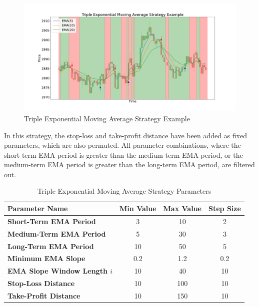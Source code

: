 \begin{figure}[H]
    \centering
    \includegraphics[width=\textwidth]{images/trading-strategies/ema-example}
    \caption{Triple Exponential Moving Average Strategy Example}
    \label{fig:ema-example}
\end{figure}

\noindent
In this strategy, the stop-loss and take-profit distance have been added as fixed parameters, which are also permuted.
All parameter combinations, where the short-term EMA period is greater than the medium-term EMA period, or the medium-term EMA period is greater than the long-term EMA period, are filtered out.

\begin{table}[H]
    \centering
    \begin{tabular}{L{4cm}ccc}
        \toprule
        Parameter Name & Min Value & Max Value & Step Size
        \\
        \midrule
        \textbf{Short-Term EMA Period}       & 3   & 10  & 2   \\
        \textbf{Medium-Term EMA Period}      & 5   & 30  & 3   \\
        \textbf{Long-Term EMA Period}        & 10  & 50  & 5   \\
        \textbf{Minimum EMA Slope}           & 0.2 & 1.2 & 0.2 \\
        \textbf{EMA Slope Window Length $i$} & 10  & 40  & 10  \\
        \textbf{Stop-Loss Distance}          & 10  & 100 & 10  \\
        \textbf{Take-Profit Distance}        & 10  & 150 & 10  \\
        \bottomrule
    \end{tabular}
    \caption{Triple Exponential Moving Average Strategy Parameters}
    \label{tbl:ema-strategy-parameters}
\end{table}

